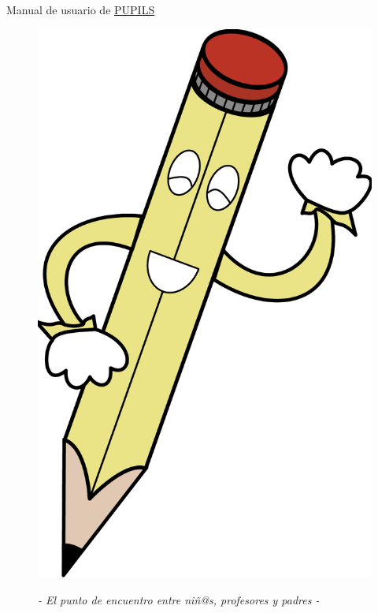 \documentclass[a4paper,12pt]{article}
\title{}
\author{Serafín Vélez Barrera - Fco. Javier Lucena Lucena \\ {\href{mailto:serafin@pupils.es}{serafin@pupils.es}} -- {\href{mailto:fran@pupils.es}{fran@pupils.es}}}
\date{\today}
\begin{document}
	\pagestyle{fancy}
	\begin{center}
		\Huge Manual de usuario de {\href{mailto:admin@pupils.es}{PUPILS}}
	\end{center}

	\begin{figure}[!ht]
		\begin{center}
			\includegraphics[scale=0.4, keepaspectratio=true]{./Imagenes/Logo/logo.pdf}
		\end{center}
		\maketitle
		\begin{center}
			\emph{\Large- El punto de encuentro entre niñ@s, profesores y padres -}
		\end{center}
	\end{figure}
	\newpage
\end{document}
